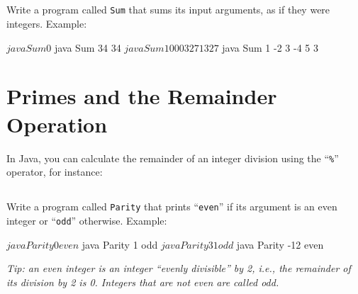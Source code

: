 \documentclass[a4paper, 12pt]{article}
\begin{document}


\subsection{}

Write a program called \texttt{Sum} that sums its input arguments, as if they
were integers. Example:

\begin{cmd}
$ java Sum
0
$ java Sum 34
34
$ java Sum 1000 327
1327
$ java Sum 1 -2 3 -4 5
3
\end{cmd}


\section{Primes and the Remainder Operation}

In Java, you can calculate the remainder of an integer division using the
``\texttt{\%}'' operator, for instance:


\subsection{}

Write a program called \texttt{Parity} that prints ``\texttt{even}'' if its
argument is an even integer or ``\texttt{odd}'' otherwise.  Example:

\begin{cmd}
$ java Parity 0
even
$ java Parity 1
odd
$ java Parity 31
odd
$ java Parity -12
even
\end{cmd}

\textsl{Tip: an \emph{even} integer is an integer ``evenly divisible'' by 2,
i.e., the remainder of its division by 2 is 0. Integers that are not even are
called \emph{odd}.}


\subsection{}
\end{document}
